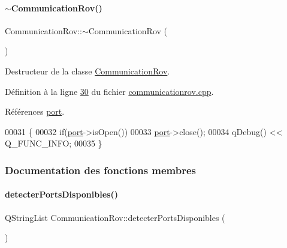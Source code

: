 \paragraph{\texorpdfstring{$\sim$\+Communication\+Rov()}{~CommunicationRov()}}
{\footnotesize\ttfamily Communication\+Rov\+::$\sim$\+Communication\+Rov (\begin{DoxyParamCaption}{ }\end{DoxyParamCaption})}



Destructeur de la classe \hyperlink{class_communication_rov}{Communication\+Rov}. 



Définition à la ligne \hyperlink{communicationrov_8cpp_source_l00030}{30} du fichier \hyperlink{communicationrov_8cpp_source}{communicationrov.\+cpp}.



Références \hyperlink{communicationrov_8h_source_l00042}{port}.


\begin{DoxyCode}
00031 \{
00032     \textcolor{keywordflow}{if}(\hyperlink{class_communication_rov_a21b62067ef0b2a6aec339df60b4abd72}{port}->isOpen())
00033         \hyperlink{class_communication_rov_a21b62067ef0b2a6aec339df60b4abd72}{port}->close();
00034     qDebug() << Q\_FUNC\_INFO;
00035 \}
\end{DoxyCode}


\subsubsection{Documentation des fonctions membres}
\mbox{\label{class_communication_rov_ad9882c08083c66cd89b472b9244727e9}} 
\paragraph{\texorpdfstring{detecter\+Ports\+Disponibles()}{detecterPortsDisponibles()}}
{\footnotesize\ttfamily Q\+String\+List Communication\+Rov\+::detecter\+Ports\+Disponibles (\begin{DoxyParamCaption}{ }\end{DoxyParamCaption})\hspace{0.3cm}{\ttfamily [static]}}




